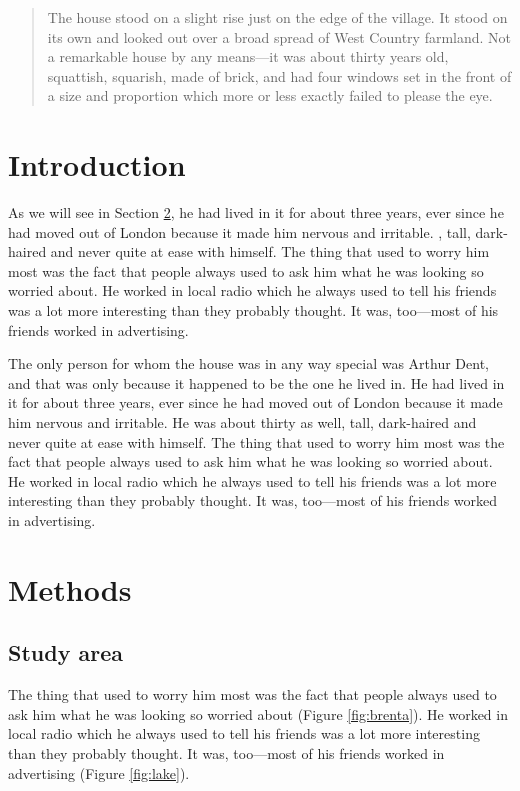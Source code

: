 \tableofcontents

\begin{abstract}
The house stood on a slight rise just on the edge of the village. It stood on its own and looked out over a broad spread of West Country farmland. Not a remarkable house by any means—it was about thirty years old, squattish, squarish, made of brick, and had four windows set in the front of a size and proportion which more or less exactly failed to please the eye.
\end{abstract}

\section{Introduction} %

 As we will see in Section \ref{sec:methods}, he had lived in it for about three years, ever since he had moved out of London because it made him nervous and irritable. , tall, dark-haired and never quite at ease with himself. The thing that used to worry him most was the fact that people always used to ask him what he was looking so worried about. He worked in local radio which he always used to tell his friends was a lot more interesting than they probably thought. It was, too—most of his friends worked in advertising.

The only person for whom the house was in any way special was Arthur Dent, and that was only because it happened to be the one he lived in. He had lived in it for about three years, ever since he had moved out of London because it made him nervous and irritable. He was about thirty as well, tall, dark-haired and never quite at ease with himself. The thing that used to worry him most was the fact that people always used to ask him what he was looking so worried about. He worked in local radio which he always used to tell his friends was a lot more interesting than they probably thought. It was, too—most of his friends worked in advertising.

\section{Methods}\label{sec:methods}
\subsection{Study area} %
The thing that used to worry him most was the fact that people always used to ask him what he was looking so worried about (Figure \ref{fig:brenta}). He worked in local radio which he always used to tell his friends was a lot more interesting than they probably thought. It was, too—most of his friends worked in advertising (Figure \ref{fig:lake}).

